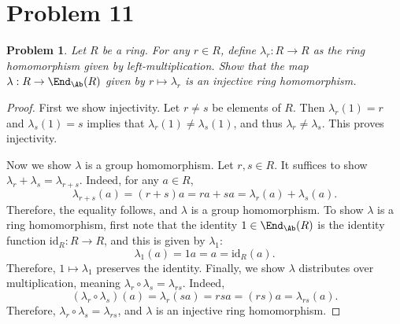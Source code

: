 \documentclass[11pt, letterpaper]{article}
\theoremstyle{plain}
\newtheorem{problem}{Problem}[section]
\begin{document}
\section{Problem 11}
\begin{problem}\label{11}
	Let $R$ be a ring. For any $r\in R$, define $\lambda _r : R \to R$ as the ring homomorphism given by left-multiplication. Show that the map $\lambda : R \to \End_{\Ab }(R) $ given by $r\mapsto \lambda _r$ is an injective ring homomorphism.
\end{problem}
\begin{proof}
	First we show injectivity. Let $r\neq s$ be elements of $R$. Then $\lambda _r(1)=r$ and $\lambda _s(1)=s$ implies that $\lambda _r(1)\neq \lambda _s(1)$, and thus $\lambda _r \neq \lambda _s$. This proves injectivity.

	Now we show $\lambda $ is a group homomorphism. Let $r,s\in R$. It suffices to show $\lambda _r+\lambda _s=\lambda _{r+s} $. Indeed, for any $a\in R$,
	\[
		\lambda _{r+s} (a)=(r+s)a=ra+sa=\lambda _r(a)+\lambda _s(a)
	.\]
	Therefore, the equality follows, and $\lambda $ is a group homomorphism. To show $\lambda $ is a ring homomorphism, first note that the identity $1\in \End_{\Ab }(R) $ is the identity function $\mathrm{id}_R: R \to R$, and this is given by $\lambda _1$:
	\[
		\lambda _1(a)=1a=a=\mathrm{id} _R(a)
	.\]
	Therefore, $1\mapsto \lambda _1$ preserves the identity. Finally, we show $\lambda $ distributes over multiplication, meaning $\lambda _r \circ \lambda _s = \lambda _{rs} $. Indeed,
	\[
		(\lambda _r \circ \lambda _s)(a)=\lambda _r(sa)=rsa=(rs)a=\lambda _{rs} (a)
	.\]
	Therefore, $\lambda _r \circ \lambda _s=\lambda _{rs} $, and $\lambda $ is an injective ring homomorphism.
\end{proof}
\end{document}

